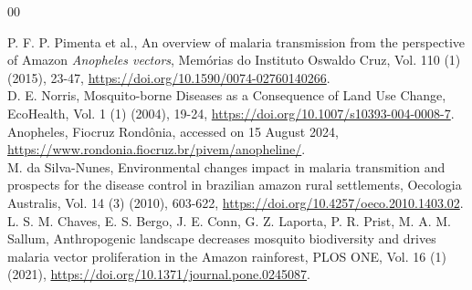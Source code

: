 \documentclass[a4paper,fleqn]{cas-dc}
\begin{document}
\newpage
\begin{thebibliography}{00}


 P. F. P. Pimenta et al., An overview of malaria transmission from the perspective of Amazon \emph{Anopheles vectors}, Memórias do Instituto Oswaldo Cruz, Vol. 110 (1) (2015), 23-47, \href{https://doi.org/10.1590/0074-02760140266}{https://doi.org/10.1590/0074-02760140266}.
\\
 D. E. Norris, Mosquito-borne Diseases as a Consequence of Land Use Change, EcoHealth, Vol. 1 (1) (2004), 19-24, \href{https://doi.org/10.1007/s10393-004-0008-7}{https://doi.org/10.1007/s10393-004-0008-7}.
\\
 Anopheles, Fiocruz Rondônia, accessed on 15 August 2024, \href{https://www.rondonia.fiocruz.br/pivem/anopheline/}{https://www.rondonia.fiocruz.br/pivem/anopheline/}.
\\
 M. da Silva-Nunes, Environmental changes impact in malaria transmition and prospects for the disease control in brazilian amazon rural settlements, Oecologia Australis, Vol. 14 (3) (2010), 603-622, \href{https://doi.org/10.4257/oeco.2010.1403.02}{https://doi.org/10.4257/oeco.2010.1403.02}.
\\
 L. S. M. Chaves, E. S. Bergo, J. E. Conn, G. Z. Laporta, P. R. Prist, M. A. M. Sallum, Anthropogenic landscape decreases mosquito biodiversity and drives malaria vector proliferation in the Amazon rainforest, PLOS ONE, Vol. 16 (1) (2021), \href{https://doi.org/10.1371/journal.pone.0245087}{https://doi.org/10.1371/journal.pone.0245087}.
\\

\end{thebibliography}
\end{document}
